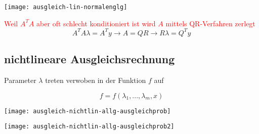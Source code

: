 \texttt{[image: ausgleich-lin-normalenglg]}

\textcolor{red}{Weil $A^T A$ aber oft schlecht konditioniert ist wird $A$ mittels
	QR-Verfahren zerlegt
}
{\Large
	$$A^T A \lambda = A^T y \rightarrow A = QR \rightarrow R \lambda = Q^T y$$
}





\subsection{nichtlineare Ausgleichsrechnung}

Parameter $\lambda$ treten verwoben in der Funktion $f$ auf

$$f = f(\lambda_1, ..., \lambda_m, x)$$

\texttt{[image: ausgleich-nichtlin-allg-ausgleichprob]}

\texttt{[image: ausgleich-nichtlin-allg-ausgleichprob2]}








